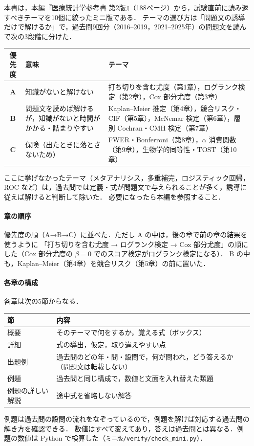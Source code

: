 本書は，本編『医療統計学参考書 第2版』（188ページ）から，試験直前に読み返すべきテーマを10個に絞ったミニ版である．
テーマの選び方は「問題文の誘導だけで解けるか」で，過去問9回分（2016--2019，2021--2025年）の問題文を読んで次の3段階に分けた．

\begin{center}\small
\begin{tabular}{@{}cL{50mm}L{80mm}@{}}
\toprule
優先度 & 意味 & テーマ\\
\midrule
\textbf{A} & 知識がないと解けない & 打ち切りを含む尤度（第1章），ログランク検定（第2章），Cox 部分尤度（第3章）\\
\textbf{B} & 問題文を読めば解けるが，知識がないと時間がかかる・詰まりやすい & Kaplan--Meier 推定（第4章），競合リスク・CIF（第5章），McNemar 検定（第6章），層別 Cochran・CMH 検定（第7章）\\
\textbf{C} & 保険（出たときに落とさないため） & FWER・Bonferroni（第8章），$\alpha$ 消費関数（第9章），生物学的同等性・TOST（第10章）\\
\bottomrule
\end{tabular}
\end{center}
ここに挙げなかったテーマ（メタアナリシス，多重補完，ロジスティック回帰，ROC など）は，過去問では定義・式が問題文で与えられることが多く，誘導に従えば解けると判断して除いた．
必要になったら本編を参照すること．

\paragraph{章の順序}
優先度の順（A→B→C）に並べた．ただし A の中は，後の章で前の章の結果を使うように
「打ち切りを含む尤度 → ログランク検定 → Cox 部分尤度」の順にした（Cox 部分尤度の $\beta=0$ でのスコア検定がログランク検定になる）．
B の中も，Kaplan--Meier（第4章）を競合リスク（第5章）の前に置いた．

\paragraph{各章の構成}
各章は次の5節からなる．
\begin{center}\small
\begin{tabular}{@{}lL{115mm}@{}}
\toprule
節 & 内容\\
\midrule
概要 & そのテーマで何をするか，覚える式（ボックス）\\
詳細 & 式の導出，仮定，取り違えやすい点\\
出題例 & 過去問のどの年・問・設問で，何が問われ，どう答えるか（問題文は転載しない）\\
例題 & 過去問と同じ構成で，数値と文面を入れ替えた類題\\
例題の詳しい解説 & 途中式を省略しない解答\\
\bottomrule
\end{tabular}
\end{center}
例題は過去問の設問の流れをなぞっているので，例題を解けば対応する過去問の解き方を確認できる．
数値はすべて変えてあり，答えは過去問とは異なる．例題の数値は Python で検算した（\texttt{ミニ版/verify/check\_mini.py}）．

